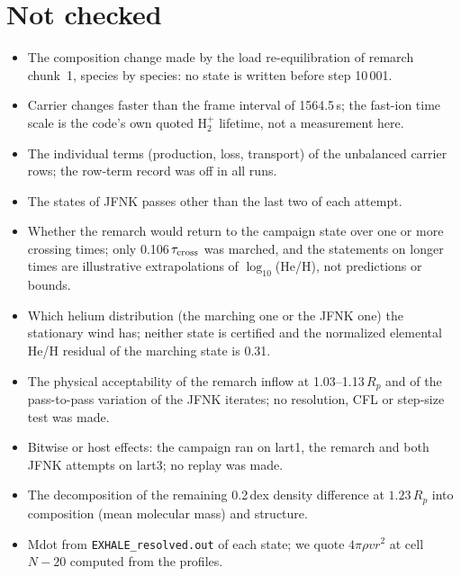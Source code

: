 \documentclass[english,a4paper]{my_memo}
\newcommand{\Rp}{R_p}
\begin{document}
\section*{Not checked}
\begin{itemize}
\item The composition change made by the load re-equilibration of remarch
chunk~1, species by species: no state is written before step 10\,001.
\item Carrier changes faster than the frame interval of 1564.5\,s; the
fast-ion time scale is the code's own quoted H$_2^+$ lifetime, not a
measurement here.
\item The individual terms (production, loss, transport) of the
unbalanced carrier rows; the row-term record was off in all runs.
\item The states of JFNK passes other than the last two of each attempt.
\item Whether the remarch would return to the campaign state over one or
more crossing times; only 0.106\,$\tau_{\rm cross}$ was marched, and the
statements on longer times are illustrative extrapolations of
$\log_{10}$(He/H), not predictions or bounds.
\item Which helium distribution (the marching one or the JFNK one) the
stationary wind has; neither state is certified and the normalized
elemental He/H residual of the marching state is 0.31.
\item The physical acceptability of the remarch inflow at
1.03--1.13\,$\Rp$ and of the pass-to-pass variation of the JFNK iterates; no
resolution, CFL or step-size test was made.
\item Bitwise or host effects: the campaign ran on lart1, the remarch and
both JFNK attempts on lart3; no replay was made.
\item The decomposition of the remaining 0.2\,dex density difference at
$1.23\,\Rp$ into composition (mean molecular mass) and structure.
\item Mdot from \texttt{EXHALE\_resolved.out} of each state; we quote
$4\pi\rho v r^2$ at cell $N-20$ computed from the profiles.
\end{itemize}
\end{document}
